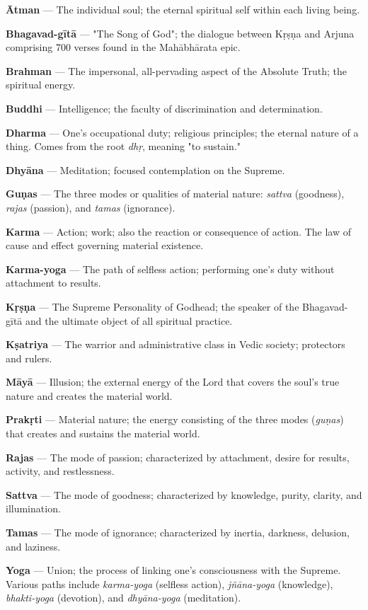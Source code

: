 \documentclass[11pt,twoside]{book}
\begin{document}
\textbf{Ātman} — The individual soul; the eternal spiritual self within each living being.

\textbf{Bhagavad-gītā} — "The Song of God"; the dialogue between Kṛṣṇa and Arjuna comprising 700 verses found in the Mahābhārata epic.

\textbf{Brahman} — The impersonal, all-pervading aspect of the Absolute Truth; the spiritual energy.

\textbf{Buddhi} — Intelligence; the faculty of discrimination and determination.

\textbf{Dharma} — One's occupational duty; religious principles; the eternal nature of a thing. Comes from the root \emph{dhṛ}, meaning "to sustain."

\textbf{Dhyāna} — Meditation; focused contemplation on the Supreme.

\textbf{Guṇas} — The three modes or qualities of material nature: \emph{sattva} (goodness), \emph{rajas} (passion), and \emph{tamas} (ignorance).

\textbf{Karma} — Action; work; also the reaction or consequence of action. The law of cause and effect governing material existence.

\textbf{Karma-yoga} — The path of selfless action; performing one's duty without attachment to results.

\textbf{Kṛṣṇa} — The Supreme Personality of Godhead; the speaker of the Bhagavad-gītā and the ultimate object of all spiritual practice.

\textbf{Kṣatriya} — The warrior and administrative class in Vedic society; protectors and rulers.

\textbf{Māyā} — Illusion; the external energy of the Lord that covers the soul's true nature and creates the material world.

\textbf{Prakṛti} — Material nature; the energy consisting of the three modes (\emph{guṇas}) that creates and sustains the material world.

\textbf{Rajas} — The mode of passion; characterized by attachment, desire for results, activity, and restlessness.

\textbf{Sattva} — The mode of goodness; characterized by knowledge, purity, clarity, and illumination.

\textbf{Tamas} — The mode of ignorance; characterized by inertia, darkness, delusion, and laziness.

\textbf{Yoga} — Union; the process of linking one's consciousness with the Supreme. Various paths include \emph{karma-yoga} (selfless action), \emph{jñāna-yoga} (knowledge), \emph{bhakti-yoga} (devotion), and \emph{dhyāna-yoga} (meditation).
\end{document}

